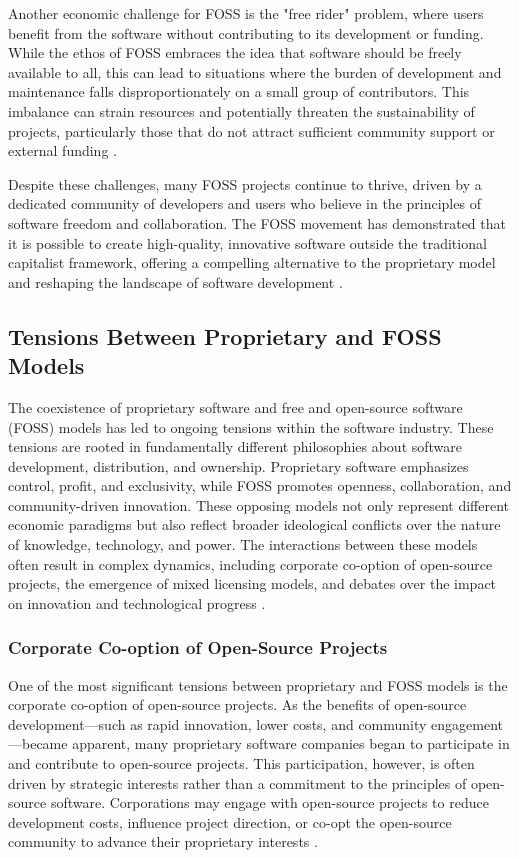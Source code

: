 \begin{refsection}
Another economic challenge for FOSS is the "free rider" problem, where users benefit from the software without contributing to its development or funding. While the ethos of FOSS embraces the idea that software should be freely available to all, this can lead to situations where the burden of development and maintenance falls disproportionately on a small group of contributors. This imbalance can strain resources and potentially threaten the sustainability of projects, particularly those that do not attract sufficient community support or external funding \cite[pp.~140-145]{weber2005}.

Despite these challenges, many FOSS projects continue to thrive, driven by a dedicated community of developers and users who believe in the principles of software freedom and collaboration. The FOSS movement has demonstrated that it is possible to create high-quality, innovative software outside the traditional capitalist framework, offering a compelling alternative to the proprietary model and reshaping the landscape of software development \cite[pp.~78-84]{benkler2010}.

\subsection{Tensions Between Proprietary and FOSS Models}

The coexistence of proprietary software and free and open-source software (FOSS) models has led to ongoing tensions within the software industry. These tensions are rooted in fundamentally different philosophies about software development, distribution, and ownership. Proprietary software emphasizes control, profit, and exclusivity, while FOSS promotes openness, collaboration, and community-driven innovation. These opposing models not only represent different economic paradigms but also reflect broader ideological conflicts over the nature of knowledge, technology, and power. The interactions between these models often result in complex dynamics, including corporate co-option of open-source projects, the emergence of mixed licensing models, and debates over the impact on innovation and technological progress \cite[pp.~25-30]{benkler2010}.

\subsubsection{Corporate Co-option of Open-Source Projects}

One of the most significant tensions between proprietary and FOSS models is the corporate co-option of open-source projects. As the benefits of open-source development—such as rapid innovation, lower costs, and community engagement—became apparent, many proprietary software companies began to participate in and contribute to open-source projects. This participation, however, is often driven by strategic interests rather than a commitment to the principles of open-source software. Corporations may engage with open-source projects to reduce development costs, influence project direction, or co-opt the open-source community to advance their proprietary interests \cite[pp.~41-45]{weber2005}.


\end{refsection}
